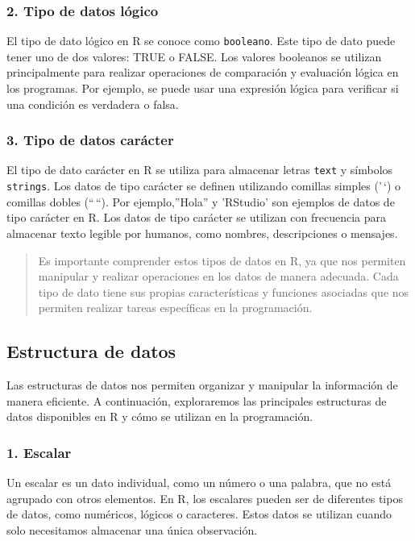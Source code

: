 \documentclass[
  jou,
  floatsintext,
  longtable,
  a4paper,
  nolmodern,
  notxfonts,
  notimes,
  12pt,
  colorlinks=true,linkcolor=blue,citecolor=blue,urlcolor=blue]{apa7}
\begin{document}
\subsubsection{2. Tipo de datos lógico}\label{tipo-de-datos-luxf3gico}

El tipo de dato lógico en R se conoce como \texttt{booleano}. Este tipo
de dato puede tener uno de dos valores: TRUE o FALSE. Los valores
booleanos se utilizan principalmente para realizar operaciones de
comparación y evaluación lógica en los programas. Por ejemplo, se puede
usar una expresión lógica para verificar si una condición es verdadera o
falsa.

\subsubsection{3. Tipo de datos
carácter}\label{tipo-de-datos-caruxe1cter}

El tipo de dato carácter en R se utiliza para almacenar letras
\texttt{text} y símbolos \texttt{strings}. Los datos de tipo carácter se
definen utilizando comillas simples ('\,`) o comillas dobles (``\,``).
Por ejemplo,''Hola'' y 'RStudio' son ejemplos de datos de tipo carácter
en R. Los datos de tipo carácter se utilizan con frecuencia para
almacenar texto legible por humanos, como nombres, descripciones o
mensajes.

\begin{quote}
Es importante comprender estos tipos de datos en R, ya que nos permiten
manipular y realizar operaciones en los datos de manera adecuada. Cada
tipo de dato tiene sus propias características y funciones asociadas que
nos permiten realizar tareas específicas en la programación.
\end{quote}

\subsection{Estructura de datos}\label{estructura-de-datos}

Las estructuras de datos nos permiten organizar y manipular la
información de manera eficiente. A continuación, exploraremos las
principales estructuras de datos disponibles en R y cómo se utilizan en
la programación.

\subsubsection{1. Escalar}\label{escalar}

Un escalar es un dato individual, como un número o una palabra, que no
está agrupado con otros elementos. En R, los escalares pueden ser de
diferentes tipos de datos, como numéricos, lógicos o caracteres. Estos
datos se utilizan cuando solo necesitamos almacenar una única
observación.
\end{document}
